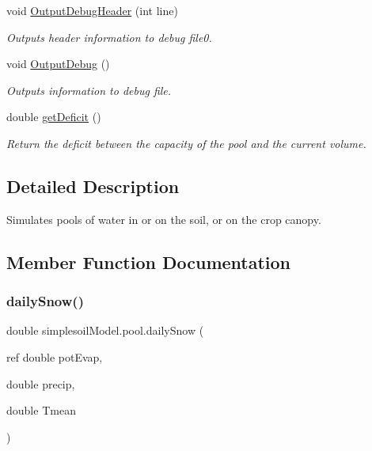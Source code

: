 \begin{DoxyCompactItemize}
void \mbox{\hyperlink{classsimplesoil_model_1_1pool_ae4545ac52a8f85f1d9796a766929e830}{Output\+Debug\+Header}} (int line)
\begin{DoxyCompactList}\small\item\em Outputs header information to debug file0. \end{DoxyCompactList}\item 
\mbox{\label{classsimplesoil_model_1_1pool_ab26e1e43b04a4f0677f0b43bdb28f290}} 
void \mbox{\hyperlink{classsimplesoil_model_1_1pool_ab26e1e43b04a4f0677f0b43bdb28f290}{Output\+Debug}} ()
\begin{DoxyCompactList}\small\item\em Outputs information to debug file. \end{DoxyCompactList}\item 
double \mbox{\hyperlink{classsimplesoil_model_1_1pool_ac59aa0194deabd5476178504a75d82f1}{get\+Deficit}} ()
\begin{DoxyCompactList}\small\item\em Return the deficit between the capacity of the pool and the current volume. \end{DoxyCompactList}\end{DoxyCompactItemize}


\subsection{Detailed Description}
Simulates pools of water in or on the soil, or on the crop canopy. 

\subsection{Member Function Documentation}
\mbox{\label{classsimplesoil_model_1_1pool_aaa4af3081e7de0130231425871a51a85}} 
\subsubsection{\texorpdfstring{dailySnow()}{dailySnow()}}
{\footnotesize\ttfamily double simplesoil\+Model.\+pool.\+daily\+Snow (\begin{DoxyParamCaption}\item[{ref double}]{pot\+Evap,  }\item[{double}]{precip,  }\item[{double}]{Tmean }\end{DoxyParamCaption})\hspace{0.3cm}{\ttfamily [inline]}}



